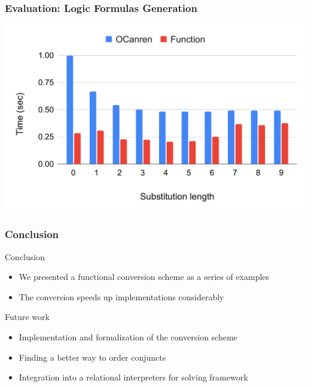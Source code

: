 \documentclass[xcolor=table]{beamer}
\begin{document}
\begin{frame}[fragile]
  \frametitle{Evaluation: Logic Formulas Generation}
  \includegraphics[width=\textwidth]{fig/eval/prop.pdf}
\end{frame}

\begin{frame}[fragile]
  \frametitle{Conclusion}
Conclusion
  \begin{itemize}
    \item We presented a functional conversion scheme as a series of examples
    \item The conversion speeds up implementations considerably
  \end{itemize}

\vfill

Future work
  \begin{itemize}
    \item Implementation and formalization of the conversion scheme
    \item Finding a better way to order conjuncts
    \item Integration into a relational interpreters for solving framework
  \end{itemize}
\end{frame}





\end{document}
